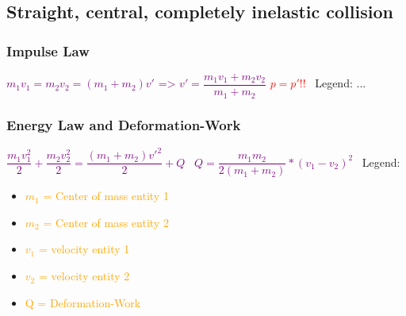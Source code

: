 \documentclass[main.tex,fontsize=8pt,paper=a4,paper=portrait,DIV=calc,]{scrartcl}
\begin{document}
\begin{multicols*}{2}
\subsection{Straight, central, completely inelastic collision}

\subsubsection{Impulse Law}
\vspace{2mm}
\large \textcolor{purple}{\( m_1v_1 = m_2v_2 = (m_1 + m_2 )v' \text{ => } v' = \dfrac{m_1v_1 + m_2v_2}{m_1 + m_2}\)}\newline
\textcolor{red}{\( p = p' \)!!}\newline
\normalsize \, \newline
Legend:\newline
...

\subsubsection{Energy Law and Deformation-Work}
\vspace{2mm}
\large \textcolor{purple}{\( \dfrac{m_1v_1^2}{2} + \dfrac{m_2v_2^2}{2} = \dfrac{(m_1 + m_2)v'^2}{2} + Q \)}\newline
\, \newline
\textcolor{purple}{\(Q = \dfrac{m_1m_2}{2(m_1+m_2)}*(v_1 -v_2)^2\)}\newline
\normalsize \, \newline
Legend:\newline
\begin{itemize}
\item \textcolor{orange}{\(m_1\) = Center of mass entity 1}
\item \textcolor{orange}{\(m_2\) = Center of mass entity 2}
\item \textcolor{orange}{\(v_1\) = velocity entity 1}
\item \textcolor{orange}{\(v_2\) = velocity entity 2}
\item \textcolor{orange}{Q = Deformation-Work}
\end{itemize}



\end{multicols*}
\end{document}
